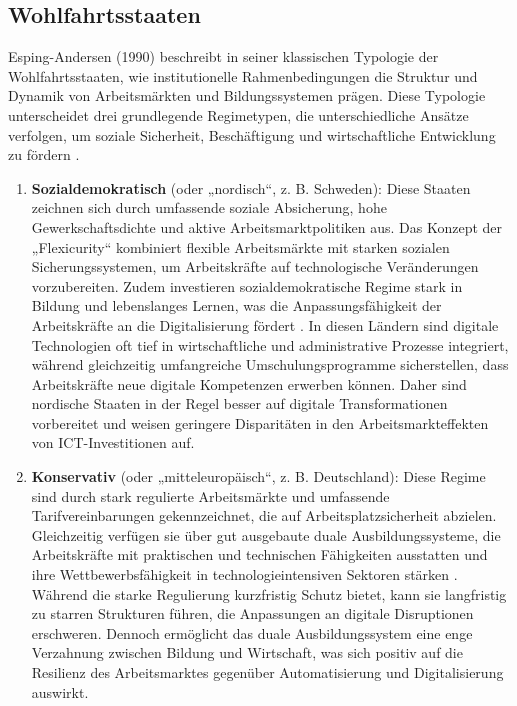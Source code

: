 
\subsection{Wohlfahrtsstaaten} 

Esping-Andersen (1990) beschreibt in seiner klassischen Typologie der Wohlfahrtsstaaten, wie 
institutionelle Rahmenbedingungen die Struktur und Dynamik von Arbeitsmärkten und 
Bildungssystemen prägen. Diese Typologie unterscheidet drei grundlegende Regimetypen, die 
unterschiedliche Ansätze verfolgen, um soziale Sicherheit, Beschäftigung und wirtschaftliche 
Entwicklung zu fördern \parencite[vgl.][S. 27–28]{espingandersen1990thethree}.

\begin{enumerate}
    \item \textbf{Sozialdemokratisch} (oder „nordisch“, z. B. Schweden): Diese Staaten 
    zeichnen sich durch umfassende soziale Absicherung, hohe Gewerkschaftsdichte und aktive 
    Arbeitsmarktpolitiken aus. Das Konzept der „Flexicurity“ kombiniert flexible Arbeitsmärkte 
    mit starken sozialen Sicherungssystemen, um Arbeitskräfte auf technologische Veränderungen 
    vorzubereiten. Zudem investieren sozialdemokratische Regime stark in Bildung und 
    lebenslanges Lernen, was die Anpassungsfähigkeit der Arbeitskräfte an die Digitalisierung 
    fördert \parencite[vgl.][S. 56]{espingandersen1990thethree}. In diesen Ländern sind digitale 
    Technologien oft tief in wirtschaftliche und administrative Prozesse integriert, während 
    gleichzeitig umfangreiche Umschulungsprogramme sicherstellen, dass Arbeitskräfte neue 
    digitale Kompetenzen erwerben können. Daher sind nordische Staaten in der Regel besser 
    auf digitale Transformationen vorbereitet und weisen geringere Disparitäten in den 
    Arbeitsmarkteffekten von \ac{ICT}-Investitionen auf.

    \item \textbf{Konservativ} (oder „mitteleuropäisch“, z. B. Deutschland): Diese 
    Regime sind durch stark regulierte Arbeitsmärkte und umfassende Tarifvereinbarungen 
    gekennzeichnet, die auf Arbeitsplatzsicherheit abzielen. Gleichzeitig verfügen sie über 
    gut ausgebaute duale Ausbildungssysteme, die Arbeitskräfte mit praktischen und technischen 
    Fähigkeiten ausstatten und ihre Wettbewerbsfähigkeit in technologieintensiven Sektoren stärken 
    \parencite[vgl.][S. 78]{hall2001varieties}. Während die starke Regulierung kurzfristig Schutz 
    bietet, kann sie langfristig zu starren Strukturen führen, die Anpassungen an digitale 
    Disruptionen erschweren. Dennoch ermöglicht das duale Ausbildungssystem eine enge Verzahnung 
    zwischen Bildung und Wirtschaft, was sich positiv auf die Resilienz des Arbeitsmarktes 
    gegenüber Automatisierung und Digitalisierung auswirkt.


\end{enumerate}
